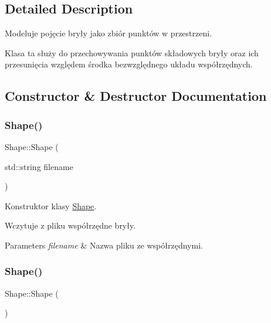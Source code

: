 \subsection{Detailed Description}
Modeluje pojęcie bryły jako zbiór punktów w przestrzeni. 

Klasa ta służy do przechowywania punktów składowych bryły oraz ich przesunięcia względem środka bezwzględnego układu współrzędnych. 

\subsection{Constructor \& Destructor Documentation}
\mbox{\label{class_shape_a7697a9694ec691492f9dbe117a640f58}} 
\subsubsection{\texorpdfstring{Shape()}{Shape()}\hspace{0.1cm}{\footnotesize\ttfamily [1/2]}}
{\footnotesize\ttfamily Shape\+::\+Shape (\begin{DoxyParamCaption}\item[{std\+::string}]{filename }\end{DoxyParamCaption})}



Konstruktor klasy \hyperlink{class_shape}{Shape}. 

Wczytuje z pliku współrzędne bryły.


\begin{DoxyParams}{Parameters}
{\em filename} & Nazwa pliku ze współrzędnymi. \\
\hline
\end{DoxyParams}
\mbox{\label{class_shape_aaa8d87171e65e0d8ba3c5459978992a7}} 
\subsubsection{\texorpdfstring{Shape()}{Shape()}\hspace{0.1cm}{\footnotesize\ttfamily [2/2]}}
{\footnotesize\ttfamily Shape\+::\+Shape (\begin{DoxyParamCaption}{ }\end{DoxyParamCaption})\hspace{0.3cm}{\ttfamily [inline]}}



